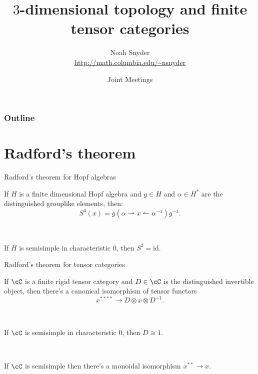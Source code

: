 \documentclass[beamer]{beamer}
\author[Noah Snyder]{Noah Snyder \\ \url{http://math.columbia.edu/~nsnyder}}
\title{$3$-dimensional topology and finite tensor categories}
\date{Joint Meetings}
\begin{document}
\frame{\titlepage}

\begin{frame}
       \frametitle{Outline}
       \tableofcontents
\end{frame}

\beamertemplatetransparentcovered 


\beamersetuncovermixins 
{} 
{} 



\section{Radford's theorem}

\begin{frame}{Radford's theorem for Hopf algebras}

\begin{theorem}[Radford 75]
If $H$ is a finite dimensional Hopf algebra and $g \in H$ and $\alpha \in H^*$ are the distinguished grouplike elements, then:
$$S^4(x) = g (\alpha \rightharpoonup x \leftharpoonup  \alpha^{-1}) g^{-1}.$$
\end{theorem}

\

\begin{theorem}
If $H$ is semisimple in characteristic $0$, then $S^2 = \mathrm{id}$.
\end{theorem}


\end{frame}

\begin{frame}{Radford's theorem for tensor categories}

\begin{theorem}[ENO 04]
If $\cC$ is a finite rigid tensor category and $D \in \cC$ is the distinguished invertible object, then there's a canonical isomorphism of tensor functors
$$x^{****}  \rightarrow D \otimes x \otimes D^{-1}.$$
\end{theorem}

\

\begin{theorem}[ENO 04]
If $\cC$ is semisimple in characteristic $0$, then $D \cong 1$.
\end{theorem}

\

\begin{conj}[ENO 02]
If $\cC$ is semisimple then there's a monoidal isomorphism $x^{**} \rightarrow x$.
\end{conj}
\end{frame}
\end{document}
